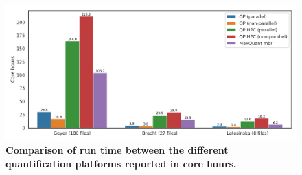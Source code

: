 \documentclass[11pt]{article}
\begin{document}
\begin{figure}[H]
  \includegraphics[width=\linewidth]{data/cores.png}
  \caption{\textbf{Comparison of run time between the different quantification platforms reported in core hours.}}
  \label{fig:corehours}
\end{figure}

\end{document}
